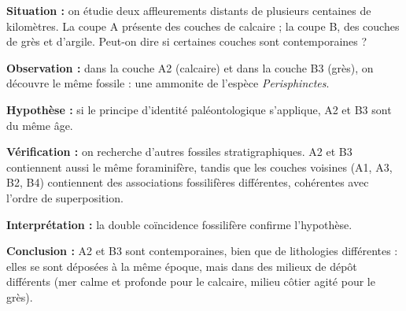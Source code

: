 \documentclass[11pt]{article}
\begin{document}
\begin{experience}
\textbf{Situation :} on étudie deux affleurements distants de plusieurs centaines de kilomètres. La coupe A présente des couches de calcaire ; la coupe B, des couches de grès et d'argile. Peut-on dire si certaines couches sont contemporaines ?

\textbf{Observation :} dans la couche A2 (calcaire) et dans la couche B3 (grès), on découvre le même fossile : une ammonite de l'espèce \emph{Perisphinctes}.

\textbf{Hypothèse :} si le principe d'identité paléontologique s'applique, A2 et B3 sont du même âge.

\textbf{Vérification :} on recherche d'autres fossiles stratigraphiques. A2 et B3 contiennent aussi le même foraminifère, tandis que les couches voisines (A1, A3, B2, B4) contiennent des associations fossilifères différentes, cohérentes avec l'ordre de superposition.

\textbf{Interprétation :} la double coïncidence fossilifère confirme l'hypothèse.

\textbf{Conclusion :} A2 et B3 sont contemporaines, bien que de lithologies différentes : elles se sont déposées à la même époque, mais dans des milieux de dépôt différents (mer calme et profonde pour le calcaire, milieu côtier agité pour le grès).
\end{experience}
\end{document}
